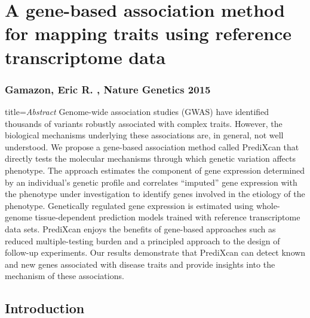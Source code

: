 \documentclass[../main.tex]{subfiles}
\begin{document}
\chapter{A gene-based association method for mapping traits using 
reference transcriptome data}

\subsection{Gamazon, Eric R. \etal, Nature Genetics 2015}

\begin{external_abstract}{title=\textit{Abstract}}
Genome-wide association studies (GWAS) have identified thousands of 
variants robustly associated with complex traits. However, the 
biological mechanisms underlying these associations are, in general, not 
well understood. We propose a gene-based association method called 
PrediXcan that directly tests the molecular mechanisms through which 
genetic variation affects phenotype. The approach estimates the 
component of gene expression determined by an individual's genetic 
profile and correlates \enquote{imputed} gene expression with the 
phenotype under investigation to identify genes involved in the etiology 
of the phenotype. Genetically regulated gene expression is estimated 
using whole-genome tissue-dependent prediction models trained with 
reference transcriptome data sets. PrediXcan enjoys the benefits of 
gene-based approaches such as reduced multiple-testing burden and a 
principled approach to the design of follow-up experiments. Our results 
demonstrate that PrediXcan can detect known and new genes associated 
with disease traits and provide insights into the mechanism of these 
associations.
\end{external_abstract}

\section{Introduction}
\end{document}
